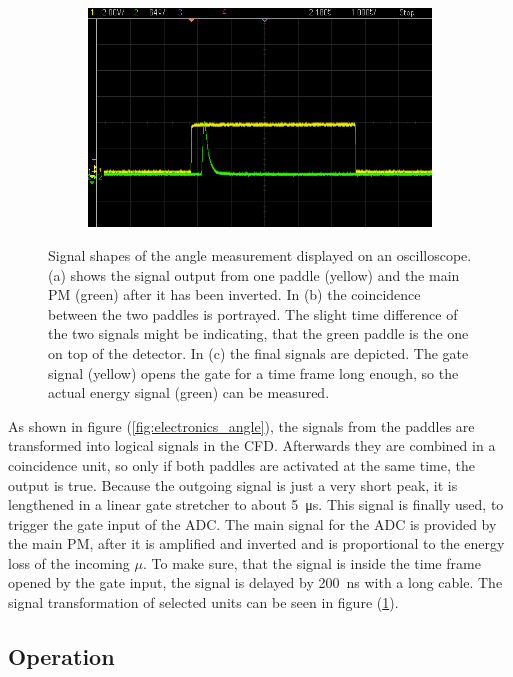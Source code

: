 \begin{figure}[ht]
\begin{subfigure}{0.32\textwidth}
			\includegraphics[width=\textwidth]{img/Winkel/scope_8.png}
			\subcaption{}
		\end{subfigure}
		
		\caption{Signal shapes of the angle measurement displayed on an oscilloscope.
		(a) shows the signal output from one paddle (yellow) and the main PM (green) after it has been inverted.
		In (b) the coincidence between the two paddles is portrayed. The slight time difference of the two signals might be indicating, that the green paddle is the one on top of the detector.
		In (c) the final signals are depicted. The gate signal (yellow) opens the gate for a time frame long enough, so the actual energy signal (green) can be measured.
	}
		\label{fig:signal_angle}
	\end{figure}

	As shown in figure (\ref{fig:electronics_angle}), the signals from the paddles are transformed into logical signals in the CFD.
	Afterwards they are combined in a coincidence unit, so only if both paddles are activated at the same time, the output is true.
	Because the outgoing signal is just a very short peak, it is lengthened in a linear gate stretcher to about \SI{5}{\micro\second}.
	This signal is finally used, to trigger the gate input of the ADC.
	The main signal for the ADC is provided by the main PM, after it is amplified and inverted and is proportional to the energy loss of the incoming $\mu$.
	To make sure, that the signal is inside the time frame opened by the gate input, the signal is delayed by \SI{200}{\nano\second} with a long cable.
	The signal transformation of selected units can be seen in figure (\ref{fig:signal_angle}).
	
\subsection{Operation}

